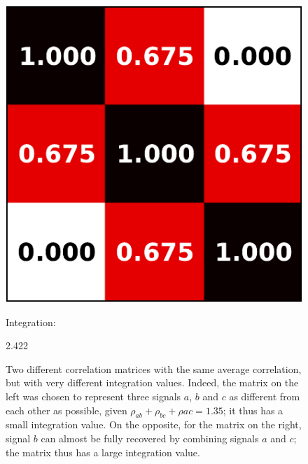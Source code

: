 \documentclass[5p]{elsarticle}
\begin{document}
\begin{figure}
\begin{minipage}{.033\linewidth}
\end{minipage}%
\hfill%
\begin{minipage}{.2\linewidth}
    \includegraphics[width=\linewidth]{correlation_ex2.pdf}
\end{minipage}%
\begin{minipage}{.19\linewidth}
    \center\sffamily
    {\small Integration:}

    2.422
\end{minipage}%
\hspace*{2ex}%

\caption{Two different correlation matrices with the same average
correlation, but with very different integration values. Indeed, the
matrix on the left was chosen to represent three signals $a$, $b$
and $c$ as different from each other as possible, given $\rho_{ab} +
\rho_{bc} + \rho{ac} = 1.35$; it thus has a small integration value. On
the opposite, for the matrix on the right, signal $b$ can almost be fully
recovered by combining signals $a$ and $c$; the matrix thus has a large
integration value.
\label{fig:integration}}
\end{figure}
\end{document}
